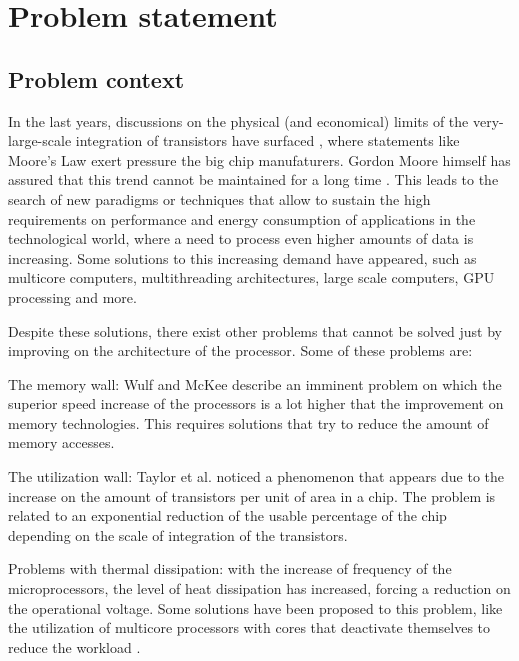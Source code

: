 \section{Problem statement}

\subsection{Problem context}

In the last years, discussions on the physical (and economical) limits of the very-large-scale integration 
of transistors have surfaced \cite{aftermoore}\cite{moorelawlimit}, where statements like Moore's Law exert pressure the big chip manufaturers.
Gordon Moore himself has assured that this trend cannot be maintained for a long time \cite{mooredead}. This leads to the
search of new paradigms or techniques that allow to sustain the high requirements on performance and 
energy consumption of applications in the technological world, where a need to process even higher amounts
of data is increasing. Some solutions to this increasing demand have appeared, such as multicore computers,
multithreading architectures, large scale computers, GPU processing and more.

Despite these solutions, there exist other problems that cannot be solved just by improving on the architecture
of the processor. Some of these problems are:

\begin{compactitem}
    \item The memory wall: Wulf and McKee \cite{memorywall} describe an imminent problem on which the superior speed increase
    of the processors is a lot higher that the improvement on memory technologies. This requires solutions that
    try to reduce the amount of memory accesses.
    \item The utilization wall: Taylor et al. \cite{utilizationwall} noticed a phenomenon that appears due to the increase on the amount
    of transistors per unit of area in a chip. The problem is related to an exponential reduction of the usable
    percentage of the chip depending on the scale of integration of the transistors.
    \item Problems with thermal dissipation: with the increase of frequency of the microprocessors, the level of 
    heat dissipation has increased, forcing a reduction on the operational voltage. Some solutions have been proposed
    to this problem, like the utilization of multicore processors with cores that deactivate themselves to reduce
    the workload \cite{whitepaper}.
\end{compactitem}

